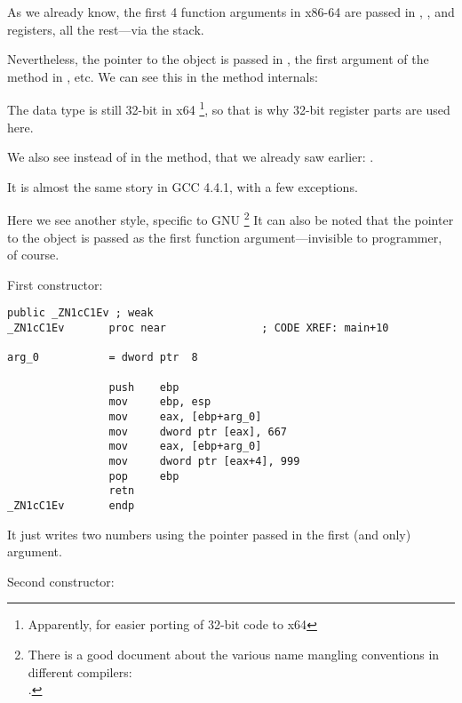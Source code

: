 As we already know, the first 4 function arguments in x86-64 are passed in \RCX, \RDX,  and 
 registers, all the rest---via the stack.

Nevertheless, the \ITthis pointer to the object is passed in \RCX, the first argument of the method in \RDX, etc.
We can see this in the 
 method internals:



The \Tint data type is still 32-bit in x64
\footnote{Apparently, for easier porting of 32-bit \CCpp code to x64}, 
so that is why 32-bit register parts are used here.

We also see  instead of \RET in the  method, that  we already saw
earlier: .


It is almost the same story in GCC 4.4.1, with a few exceptions.



Here we see another  style, specific to GNU
\footnote{There is a good document about the various name mangling conventions in different compilers:\\
\InSqBrackets{\AgnerFogCC}.}
It can also be noted that the pointer to the object is passed as the first function 
argument---invisible to programmer, of course.

First constructor:

\begin{lstlisting}[style=customasmx86]
                public _ZN1cC1Ev ; weak
_ZN1cC1Ev       proc near               ; CODE XREF: main+10

arg_0           = dword ptr  8

                push    ebp
                mov     ebp, esp
                mov     eax, [ebp+arg_0]
                mov     dword ptr [eax], 667
                mov     eax, [ebp+arg_0]
                mov     dword ptr [eax+4], 999
                pop     ebp
                retn
_ZN1cC1Ev       endp
\end{lstlisting}

It just writes two numbers using the pointer passed in the first (and only) argument.

Second constructor:

